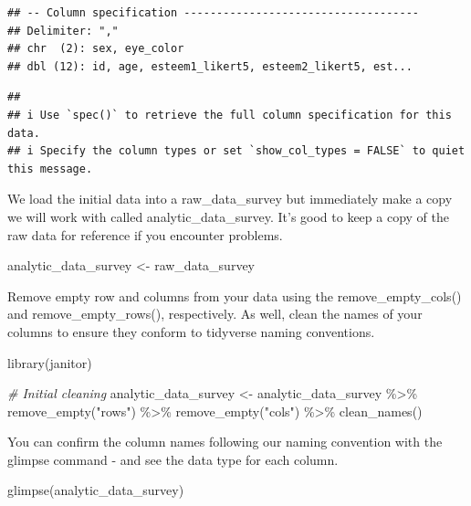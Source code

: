 \documentclass[
]{krantz}
\makeatletter
\newenvironment{Shaded}{\begin{snugshade}}{\end{snugshade}}
\newcommand{\CommentTok}[1]{\textcolor[rgb]{0.37,0.37,0.37}{\textit{#1}}}
\newcommand{\FunctionTok}[1]{\textcolor[rgb]{0,0,0}{#1}}
\newcommand{\NormalTok}[1]{#1}
\newcommand{\OtherTok}[1]{\textcolor[rgb]{0.37,0.37,0.37}{#1}}
\newcommand{\SpecialCharTok}[1]{\textcolor[rgb]{0,0,0}{#1}}
\newcommand{\StringTok}[1]{\textcolor[rgb]{0.5,0.5,0.5}{#1}}
\newenvironment{kframe}{%
\medskip{}
\setlength{\fboxsep}{.8em}
 \def\at@end@of@kframe{}%
 \ifinner\ifhmode%
  \def\at@end@of@kframe{\end{minipage}}%
  \begin{minipage}{\columnwidth}%
 \fi\fi%
 \def\FrameCommand##1{\hskip\@totalleftmargin \hskip-\fboxsep
 \colorbox{shadecolor}{##1}\hskip-\fboxsep
     \hskip-\linewidth \hskip-\@totalleftmargin \hskip\columnwidth}%
 \MakeFramed {\advance\hsize-\width
   \@totalleftmargin\z@ \linewidth\hsize
   \@setminipage}}%
 {\par\unskip\endMakeFramed%
 \at@end@of@kframe}
\renewenvironment{Shaded}{\begin{kframe}}{\end{kframe}}
\makeatother
\begin{document}
\begin{verbatim}
## -- Column specification ------------------------------------
## Delimiter: ","
## chr  (2): sex, eye_color
## dbl (12): id, age, esteem1_likert5, esteem2_likert5, est...
\end{verbatim}

\begin{verbatim}
## 
## i Use `spec()` to retrieve the full column specification for this data.
## i Specify the column types or set `show_col_types = FALSE` to quiet this message.
\end{verbatim}

We load the initial data into a raw\_data\_survey but immediately make a copy we will work with called analytic\_data\_survey. It's good to keep a copy of the raw data for reference if you encounter problems.

\begin{Shaded}
\begin{Highlighting}[]
\NormalTok{analytic\_data\_survey }\OtherTok{\textless{}{-}}\NormalTok{ raw\_data\_survey}
\end{Highlighting}
\end{Shaded}

Remove empty row and columns from your data using the remove\_empty\_cols() and remove\_empty\_rows(), respectively. As well, clean the names of your columns to ensure they conform to tidyverse naming conventions.

\begin{Shaded}
\begin{Highlighting}[]
\FunctionTok{library}\NormalTok{(janitor)}

\CommentTok{\# Initial cleaning}
\NormalTok{analytic\_data\_survey }\OtherTok{\textless{}{-}}\NormalTok{ analytic\_data\_survey }\SpecialCharTok{\%\textgreater{}\%}
  \FunctionTok{remove\_empty}\NormalTok{(}\StringTok{"rows"}\NormalTok{) }\SpecialCharTok{\%\textgreater{}\%}
  \FunctionTok{remove\_empty}\NormalTok{(}\StringTok{"cols"}\NormalTok{) }\SpecialCharTok{\%\textgreater{}\%}
  \FunctionTok{clean\_names}\NormalTok{()}
\end{Highlighting}
\end{Shaded}

You can confirm the column names following our naming convention with the glimpse command - and see the data type for each column.

\begin{Shaded}
\begin{Highlighting}[]
\FunctionTok{glimpse}\NormalTok{(analytic\_data\_survey)}
\end{Highlighting}
\end{Shaded}
\end{document}
